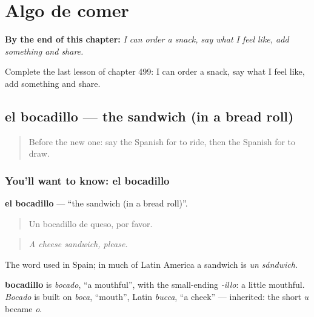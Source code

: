 
\chapter{Algo de comer}
\label{ch:es-algo-de-comer}

\begin{chapteropening}
\textbf{By the end of this chapter:} \emph{I can order a snack, say what I feel like, add something and share.}

Complete the last lesson of chapter 499: I can order a snack, say what I feel like, add something and share.
\end{chapteropening}

\section[el bocadillo]{el bocadillo — the sandwich (in a bread roll)}

\label{lesson:ES-C499-bocadillo}



\begin{quote}
Before the new one: say the Spanish for to ride, then the Spanish for to draw.
\end{quote}

\subsection*{You'll want to know: el bocadillo}
\textbf{el bocadillo} — \textquotedblleft{}the sandwich (in a bread roll)\textquotedblright{}.

\begin{quote}
Un bocadillo de queso, por favor.
\end{quote}

\begin{quote}
\emph{A cheese sandwich, please.}
\end{quote}

The word used in Spain; in much of Latin America a sandwich is \emph{un sándwich}.

\begin{cousinweb}
\textbf{bocadillo} is \emph{bocado}, \textquotedblleft{}a mouthful\textquotedblright{}, with the small-ending \emph{-illo}: a little mouthful. \emph{Bocado} is built on \emph{boca}, \textquotedblleft{}mouth\textquotedblright{}, Latin \emph{bucca}, \textquotedblleft{}a cheek\textquotedblright{} — inherited: the short \emph{u} became \emph{o}.
\end{cousinweb}

